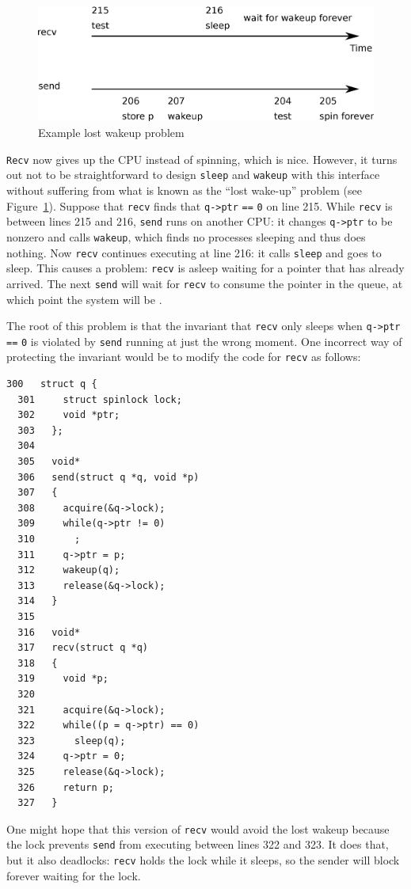 \begin{figure}[t]
\center
\includegraphics[scale=0.5]{fig/deadlock.eps}
\caption{Example lost wakeup problem}
\label{fig:deadlock}
\end{figure}

\lstinline{Recv}
now gives up the CPU instead of spinning, which is nice.
However, it turns out not to be straightforward to design
\lstinline{sleep}
and 
\lstinline{wakeup}
with this interface without suffering
from what is known as the ``lost wake-up'' problem (see 
Figure~\ref{fig:deadlock}).
Suppose that
\lstinline{recv}
finds that
\lstinline{q->ptr}
\lstinline{==}
\lstinline{0} 
on line 215.
While
\lstinline{recv}
is between lines 215 and 216,
\lstinline{send}
runs on another CPU:
it changes
\lstinline{q->ptr}
to be nonzero and calls
\lstinline{wakeup},
which finds no processes sleeping and thus does nothing.
Now
\lstinline{recv}
continues executing at line 216:
it calls
\lstinline{sleep}
and goes to sleep.
This causes a problem:
\lstinline{recv}
is asleep waiting for a pointer
that has already arrived.
The next
\lstinline{send}
will wait for 
\lstinline{recv}
to consume the pointer in the queue,
at which point the system will be 
.

The root of this problem is that the
invariant that
\lstinline{recv}
only sleeps when
\lstinline{q->ptr}
\lstinline{==}
\lstinline{0}
is violated by 
\lstinline{send}
running at just the wrong moment.
One incorrect way of protecting the invariant would be to modify the code for
\lstinline{recv}
as follows:
\begin{lstlisting}[]
  300	struct q {
  301	  struct spinlock lock;
  302	  void *ptr;
  303	};
  304	
  305	void*
  306	send(struct q *q, void *p)
  307	{
  308	  acquire(&q->lock);
  309	  while(q->ptr != 0)
  310	    ;
  311	  q->ptr = p;
  312	  wakeup(q);
  313	  release(&q->lock);
  314	}
  315	
  316	void*
  317	recv(struct q *q)
  318	{
  319	  void *p;
  320	
  321	  acquire(&q->lock);
  322	  while((p = q->ptr) == 0)
  323	    sleep(q);
  324	  q->ptr = 0;
  325	  release(&q->lock);
  326	  return p;
  327	}
\end{lstlisting}
One might hope that this version of
\lstinline{recv}
would avoid the lost wakeup because the lock prevents
\lstinline{send}
from executing between lines 322 and 323.
It does that, but it also deadlocks:
\lstinline{recv}
holds the lock while it sleeps,
so the sender will block forever waiting for the lock.

